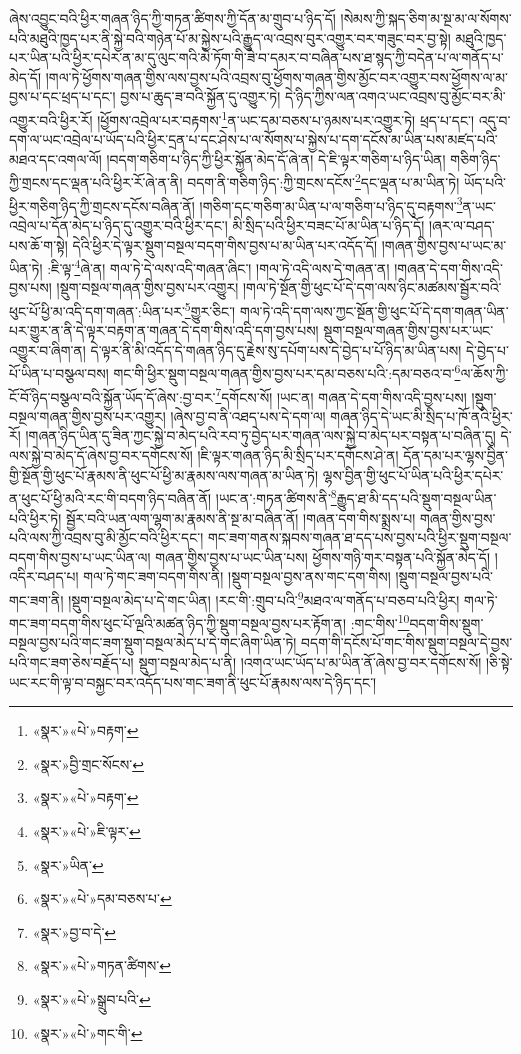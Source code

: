 ཞེས་འབྱུང་བའི་ཕྱིར་གཞན་ཉིད་ཀྱི་གཏན་ཚིགས་ཀྱི་དོན་མ་གྲུབ་པ་ཉིད་དོ། །སེམས་ཀྱི་སྐད་ཅིག་མ་སྔ་མ་ལ་སོགས་པའི་མཐུའི་ཁྱད་པར་ནི་སྐྱེ་བའི་གཉེན་པོ་མ་སྐྱེས་པའི་རྒྱུད་ལ་འབྲས་བུར་འགྱུར་བར་གཟུང་བར་བྱ་སྟེ། མཐུའི་ཁྱད་པར་ཡིན་པའི་ཕྱིར་དཔེར་ན་མ་དུ་ལུང་གའི་མེ་ཏོག་གི་ཟེ་བ་དམར་བ་བཞིན་པས་ཐ་སྙད་ཀྱི་བདེན་པ་ལ་གནོད་པ་མེད་དོ། །གལ་ཏེ་ཕྱོགས་གཞན་གྱིས་ལས་བྱས་པའི་འབྲས་བུ་ཕྱོགས་གཞན་གྱིས་མྱོང་བར་འགྱུར་བས་ཕྱོགས་ལ་མ་བྱས་པ་དང་ཕྲད་པ་དང་། བྱས་པ་ཆུད་ཟ་བའི་སྐྱོན་དུ་འགྱུར་ཏེ། དེ་ཉིད་ཀྱིས་ལན་འགའ་ཡང་འབྲས་བུ་མྱོང་བར་མི་འགྱུར་བའི་ཕྱིར་རོ། །ཕྱོགས་འབྲེལ་པར་བརྟགས་\footnote{«སྣར་»«པེ་»བརྟག་}ན་ཡང་དམ་བཅས་པ་ཉམས་པར་འགྱུར་ཏེ། ཕྲད་པ་དང་། འདུ་བ་དག་ལ་ཡང་འབྲེལ་པ་ཡོད་པའི་ཕྱིར་དྲན་པ་དང་ཤེས་པ་ལ་སོགས་པ་སྐྱེས་པ་དག་དངོས་མ་ཡིན་པས་མཛད་པའི་མཐའ་དང་འགལ་ལོ། །བདག་གཅིག་པ་ཉིད་ཀྱི་ཕྱིར་སྐྱོན་མེད་དོ་ཞེ་ན། དེ་ཇི་ལྟར་གཅིག་པ་ཉིད་ཡིན། གཅིག་ཉིད་ཀྱི་གྲངས་དང་ལྡན་པའི་ཕྱིར་རོ་ཞེ་ན་ནི། བདག་ནི་གཅིག་ཉིད་:ཀྱི་གྲངས་དངོས་\footnote{«སྣར་»བྱི་གྲང་སོངས་}དང་ལྡན་པ་མ་ཡིན་ཏེ། ཡོད་པའི་ཕྱིར་གཅིག་ཉིད་ཀྱི་གྲངས་དངོས་བཞིན་ནོ། །གཅིག་དང་གཅིག་མ་ཡིན་པ་ལ་གཅིག་པ་ཉིད་དུ་བརྟགས་\footnote{«སྣར་»«པེ་»བརྟག་}ན་ཡང་འབྲེལ་པ་དོན་མེད་པ་ཉིད་དུ་འགྱུར་བའི་ཕྱིར་དང་། མི་སྲིད་པའི་ཕྱིར་བཟང་པོ་མ་ཡིན་པ་ཉིད་དོ། །ཞར་ལ་བཤད་པས་ཆོ་ག་སྟེ། དེའི་ཕྱིར་དེ་ལྟར་སྡུག་བསྔལ་བདག་གིས་བྱས་པ་མ་ཡིན་པར་འདོད་དོ། །གཞན་གྱིས་བྱས་པ་ཡང་མ་ཡིན་ཏེ། :ཇི་ལྟ་\footnote{«སྣར་»«པེ་»ཇི་ལྟར་}ཞེ་ན། གལ་ཏེ་དེ་ལས་འདི་གཞན་ཞིང་། །གལ་ཏེ་འདི་ལས་དེ་གཞན་ན། །གཞན་དེ་དག་གིས་འདི་བྱས་པས། །སྡུག་བསྔལ་གཞན་གྱིས་བྱས་པར་འགྱུར། །གལ་ཏེ་སྔོན་གྱི་ཕུང་པོ་དེ་དག་ལས་ཉིང་མཚམས་སྦྱོར་བའི་ཕུང་པོ་ཕྱི་མ་འདི་དག་གཞན་:ཡིན་པར་\footnote{«སྣར་»ཡིན་}གྱུར་ཅིང་། གལ་ཏེ་འདི་དག་ལས་ཀྱང་སྔོན་གྱི་ཕུང་པོ་དེ་དག་གཞན་ཡིན་པར་གྱུར་ན་ནི་དེ་ལྟར་བརྟག་ན་གཞན་དེ་དག་གིས་འདི་དག་བྱས་པས། སྡུག་བསྔལ་གཞན་གྱིས་བྱས་པར་ཡང་འགྱུར་བ་ཞིག་ན། དེ་ལྟར་ནི་མི་འདོད་དེ་གཞན་ཉིད་དུ་རྗེས་སུ་དཔོག་པས་དེ་བྱེད་པ་པོ་ཉིད་མ་ཡིན་པས། དེ་བྱེད་པ་པོ་ཡིན་པ་བསྩལ་བས། གང་གི་ཕྱིར་སྡུག་བསྔལ་གཞན་གྱིས་བྱས་པར་དམ་བཅས་པའི་:དམ་བཅའ་བ་\footnote{«སྣར་»«པེ་»དམ་བཅས་པ་}ལ་ཆོས་ཀྱི་ངོ་བོ་ཉིད་བསྩལ་བའི་སྐྱོན་ཡོད་དོ་ཞེས་:བྱ་བར་\footnote{«སྣར་»བྱ་བ་དེ་}དགོངས་སོ། །ཡང་ན། གཞན་དེ་དག་གིས་འདི་བྱས་པས། །སྡུག་བསྔལ་གཞན་གྱིས་བྱས་པར་འགྱུར། །ཞེས་བྱ་བ་ནི་འཐད་པས་དེ་དག་ལ། གཞན་ཉིད་དེ་ཡང་མི་སྲིད་པ་ཁོ་ནའི་ཕྱིར་རོ། །གཞན་ཉིད་ཡིན་དུ་ཟིན་ཀྱང་སྐྱེ་བ་མེད་པའི་རབ་ཏུ་བྱེད་པར་གཞན་ལས་སྐྱེ་བ་མེད་པར་བསྟན་པ་བཞིན་དུ། དེ་ལས་སྐྱེ་བ་མེད་དོ་ཞེས་བྱ་བར་དགོངས་སོ། །ཇི་ལྟར་གཞན་ཉིད་མི་སྲིད་པར་དགོངས་ཤེ་ན། དོན་དམ་པར་ལྷས་བྱིན་གྱི་སྔོན་གྱི་ཕུང་པོ་རྣམས་ནི་ཕུང་པོ་ཕྱི་མ་རྣམས་ལས་གཞན་མ་ཡིན་ཏེ། ལྷས་བྱིན་གྱི་ཕུང་པོ་ཡིན་པའི་ཕྱིར་དཔེར་ན་ཕུང་པོ་ཕྱི་མའི་རང་གི་བདག་ཉིད་བཞིན་ནོ། །ཡང་ན་:གཏན་ཚིགས་ནི་\footnote{«སྣར་»«པེ་»གཏན་ཚིགས་}རྒྱུད་ཐ་མི་དད་པའི་སྡུག་བསྔལ་ཡིན་པའི་ཕྱིར་ཏེ། སྦྱོར་བའི་ཡན་ལག་ལྷག་མ་རྣམས་ནི་སྔ་མ་བཞིན་ནོ། །གཞན་དག་གིས་སྨྲས་པ། གཞན་གྱིས་བྱས་པའི་ལས་ཀྱི་འབྲས་བུ་མི་མྱོང་བའི་ཕྱིར་དང་། གང་ཟག་གནས་སྐབས་གཞན་ཐ་དད་པས་བྱས་པའི་ཕྱིར་སྡུག་བསྔལ་བདག་གིས་བྱས་པ་ཡང་ཡིན་ལ། གཞན་གྱིས་བྱས་པ་ཡང་ཡིན་པས། ཕྱོགས་གཉི་གར་བསྟན་པའི་སྐྱོན་མེད་དོ། །འདིར་བཤད་པ། གལ་ཏེ་གང་ཟག་བདག་གིས་ནི། །སྡུག་བསྔལ་བྱས་ནས་གང་དག་གིས། །སྡུག་བསྔལ་བྱས་པའི་གང་ཟག་ནི། །སྡུག་བསྔལ་མེད་པ་དེ་གང་ཡིན། །རང་གི་:གྲུབ་པའི་\footnote{«སྣར་»«པེ་»སྒྲུབ་པའི་}མཐའ་ལ་གནོད་པ་བཅབ་པའི་ཕྱིར། གལ་ཏེ་གང་ཟག་བདག་གིས་ཕུང་པོ་ལྔའི་མཚན་ཉིད་ཀྱི་སྡུག་བསྔལ་བྱས་པར་རྟོག་ན། :གང་གིས་\footnote{«སྣར་»«པེ་»གང་གི་}བདག་གིས་སྡུག་བསྔལ་བྱས་པའི་གང་ཟག་སྡུག་བསྔལ་མེད་པ་དེ་གང་ཞིག་ཡིན་ཏེ། བདག་གི་དངོས་པོ་གང་གིས་སྡུག་བསྔལ་དེ་བྱས་པའི་གང་ཟག་ཅེས་བརྗོད་པ། སྡུག་བསྔལ་མེད་པ་ནི། །འགའ་ཡང་ཡོད་པ་མ་ཡིན་ནོ་ཞེས་བྱ་བར་དགོངས་སོ། །ཅི་སྟེ་ཡང་རང་གི་ལྟ་བ་བསྐྱང་བར་འདོད་པས་གང་ཟག་ནི་ཕུང་པོ་རྣམས་ལས་དེ་ཉིད་དང་། 